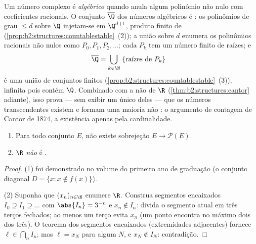 \begin{example}\label{ex:b2:structures:algebraic}
Um número complexo é \emph{algébrico} quando anula algum
polinômio não nulo com coeficientes racionais. O conjunto
$\overline\Q$ dos números algébricos é : os polinômios de
grau $\leq d$ sobre $\Q$ injetam-se em $\Q^{d+1}$, produto finito
de 
(\cref{prop:b2:structures:countablestable}~(2)); a união sobre
$d$ enumera os polinômios racionais não nulos como $P_0, P_1,
P_2, \dots$; cada $P_k$ tem um número finito de raízes; e
\[
\overline\Q = \bigcup_{k \in \N}\ \{\text{raízes de } P_k\}
\]
é uma união  de conjuntos finitos
(\cref{prop:b2:structures:countablestable}~(3)), infinita pois
contém $\Q$. Combinado com a não  de $\R$
(\cref{thm:b2:structures:cantor} adiante), isso prova --- sem
exibir um único deles --- que os números transcendentes existem
e formam uma maioria não : o argumento de contagem de Cantor
de 1874, a existência apenas pela cardinalidade.
\end{example}

\begin{theorem}\label{thm:b2:structures:cantor}
\begin{enumerate}
  \item Para todo conjunto $E$, não existe sobrejeção $E \to
        \mathcal{P}(E)$.
  \item $\R$ \emph{não} é .
\end{enumerate}
\end{theorem}

\begin{proof}
(1) foi demonstrado no volume do primeiro ano de graduação (o conjunto diagonal $D = \{x : x
\notin f(x)\}$).

(2) Suponha que $(x_n)_{n \in \N}$ enumere $\R$. Construa segmentos encaixados
$I_0 \supseteq I_1 \supseteq \dots$ com $\abs{I_n} = 3^{-n}$ e
$x_n \notin I_n$: divida o segmento atual em três terços fechados;
ao menos um terço evita $x_n$ (um ponto encontra no máximo dois dos
três). O teorema dos segmentos encaixados (extremidades adjacentes) fornece
$\ell \in \bigcap_n I_n$; mas $\ell = x_N$ para algum $N$, e $x_N
\notin I_N$: contradição.
\end{proof}

